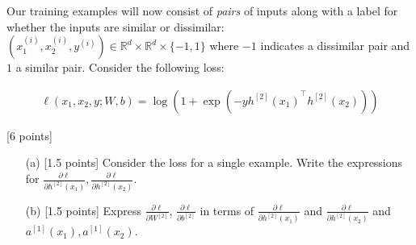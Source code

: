 \documentclass{article}
\newif\ifsolutions
\newenvironment{labelledanswer}{{\bf Answer:} \sf }{}%
\newcommand{\answer}[2]
{{
\ifsolutions
\begin{labelledanswer}
\color{red} 
#2
\end{labelledanswer}
\else
#1
\fi
}}
\begin{document}
Our training examples will now consist of \textit{pairs} of inputs along with a label for whether the inputs are similar or dissimilar: $(x^{(i)}_1, x^{(i)}_2, y^{(i)}) \in \mathbb{R}^{d} \times \mathbb{R}^d \times \{-1, 1\}$ where $-1$ indicates a dissimilar pair and $1$ a similar pair. Consider the following loss:

\begin{align}
    \ell(x_1, x_2, y; W, b) = \log\left(1 + \exp(-y{h^{[2]}(x_1)}^\top h^{[2]}(x_2))\right)
\end{align}

\noindent {} [6 points]

\begin{itemize}
    \item [(a)] [1.5 points] Consider the loss for a single example. Write the expressions for $\frac{\partial \ell}{\partial h^{[2]}(x_1)},  \frac{\partial \ell}{\partial h^{[2]}(x_2)}$. 
    
    \answer{}{

$$
\frac{\partial}{\partial h^{[2]}(x_1)} \ell(x_1, x_2, y; W, b)= \frac{1}{1 + \exp(-y{h^{[2]}(x_1)}^\top h^{[2]}(x_2))} \;  \left(  0 + \exp(-y{h^{[2]}(x_1)}^\top h^{[2]}(x_2)) (-y h^{[2]}(x_2))   \right)
$$
$$
= \frac{ -y h^{[2]}(x_2) e^{(-y{h^{[2]}(x_1)}^\top h^{[2]}(x_2))}}{1 + e^{ -y{h^{[2]}(x_1)}^\top h^{[2]}(x_2)}}
$$

$$
\frac{\partial}{\partial h^{[2]}(x_2)} \ell(x_1, x_2, y; W, b)= \frac{1}{1 + \exp(-y{h^{[2]}(x_1)}^\top h^{[2]}(x_2))} \;  \left(  0 + \exp(-y{h^{[2]}(x_1)}^\top h^{[2]}(x_2)) (-y {h^{[2]}(x_1))}^\top   \right)
$$
$$
= \frac{ -y {h^{[2]}(x_1)}^\top e^{(-y{h^{[2]}(x_1)}^\top h^{[2]}(x_2))}}{1 + e^{-y{h^{[2]}(x_1)}^\top h^{[2]}(x_2)}} 
$$           
    }
    
    \item [(b)] [1.5 points] Express $\frac{\partial \ell}{\partial W^{[2]}}$, $\frac{\partial \ell}{\partial b^{[2]}}$ in terms of $\frac{\partial \ell}{\partial h^{[2]}(x_1)}$ and $\frac{\partial \ell}{\partial h^{[2]}(x_2)}$ and $a^{[1]}(x_1), a^{[1]}(x_2)$.
    
    \answer{}{

}
\end{itemize}
\end{document}
